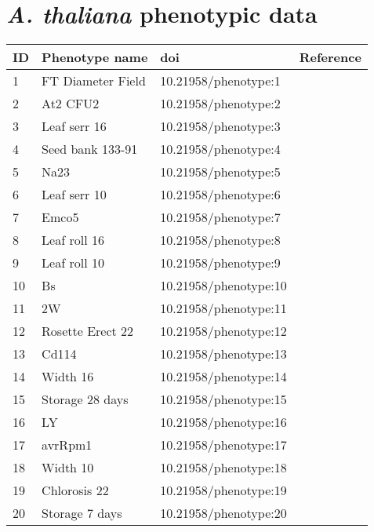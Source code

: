 
\chapter{\textit{A. thaliana} phenotypic data} %
\label{AppendixB} %
\begin{longtable}{p{} p{} p{} p{}}
  \toprule
  ID & Phenotype name & doi & Reference \\
  \midrule
 1 & FT Diameter Field & 10.21958/phenotype:1 & \cite{atwell2010}\\
 2 & At2 CFU2 & 10.21958/phenotype:2 & \cite{atwell2010}\\
 3 & Leaf serr 16 & 10.21958/phenotype:3 & \cite{atwell2010}\\
 4 & Seed bank 133-91 & 10.21958/phenotype:4 & \cite{atwell2010}\\
 5 & Na23 & 10.21958/phenotype:5 & \cite{atwell2010}\\
 6 & Leaf serr 10 & 10.21958/phenotype:6 & \cite{atwell2010}\\
 7 & Emco5 & 10.21958/phenotype:7 & \cite{atwell2010}\\
 8 & Leaf roll 16 & 10.21958/phenotype:8 & \cite{atwell2010}\\
 9 & Leaf roll 10 & 10.21958/phenotype:9 & \cite{atwell2010}\\
 10 & Bs & 10.21958/phenotype:10 & \cite{atwell2010}\\
 11 & 2W & 10.21958/phenotype:11 & \cite{atwell2010}\\
 12 & Rosette Erect 22 & 10.21958/phenotype:12 & \cite{atwell2010}\\
 13 & Cd114 & 10.21958/phenotype:13 & \cite{atwell2010}\\
 14 & Width 16 & 10.21958/phenotype:14 & \cite{atwell2010}\\
 15 & Storage 28 days & 10.21958/phenotype:15 & \cite{atwell2010}\\
 16 & LY & 10.21958/phenotype:16 & \cite{atwell2010}\\
 17 & avrRpm1 & 10.21958/phenotype:17 & \cite{atwell2010}\\
 18 & Width 10 & 10.21958/phenotype:18 & \cite{atwell2010}\\
 19 & Chlorosis 22 & 10.21958/phenotype:19 & \cite{atwell2010}\\
 20 & Storage 7 days & 10.21958/phenotype:20 & \cite{atwell2010}\\

\end{longtable}
